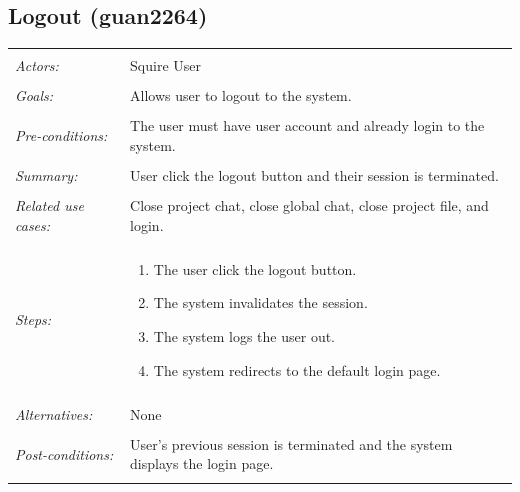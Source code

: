 \documentclass[11pt]{report}
\begin{document}
\subsection{Logout (guan2264)}
\begin{tabular}{ p{2cm} p{12cm} }
 \hline
 \\
 \textit{Actors:} & Squire User \\ 
 \\
 \textit{Goals:} & Allows user to logout to the system. \\
 \\
 \textit{Pre-conditions:} & The user must have user account and already login to the system. \\
 \\
 \textit{Summary:} & User click the logout button and their session is terminated. \\ 
 \\
 \textit{Related use cases:} & Close project chat, close global chat, close project file, and login. \\ 
 \\
 \textit{Steps:} & \begin{enumerate}
  \item The user click the logout button.
  \item The system invalidates the session.
  \item The system logs the user out.
  \item The system redirects to the default login page.
 \end{enumerate} \\
 \\
 \textit{Alternatives:} & None\\
 \\
 \textit{Post-conditions:} & User's previous session is terminated and the system displays the login page. \\
 \\
\hline
\end{tabular}
\end{document}
